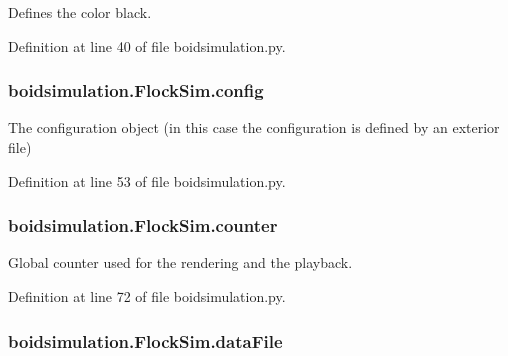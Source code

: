 Defines the color black. 



Definition at line 40 of file boidsimulation.\-py.

\hypertarget{classboidsimulation_1_1FlockSim_abf487d6e84851334a79656b5df3c8492}{
\subsubsection[{config}]{\setlength{\rightskip}{0pt plus 5cm}boidsimulation.\-Flock\-Sim.\-config}}\label{classboidsimulation_1_1FlockSim_abf487d6e84851334a79656b5df3c8492}


The configuration object (in this case the configuration is defined by an exterior file) 



Definition at line 53 of file boidsimulation.\-py.

\hypertarget{classboidsimulation_1_1FlockSim_af378fd310919691dec50f5d312931726}{
\subsubsection[{counter}]{\setlength{\rightskip}{0pt plus 5cm}boidsimulation.\-Flock\-Sim.\-counter}}\label{classboidsimulation_1_1FlockSim_af378fd310919691dec50f5d312931726}


Global counter used for the rendering and the playback. 



Definition at line 72 of file boidsimulation.\-py.

\hypertarget{classboidsimulation_1_1FlockSim_a96885e067ac2333f807eaa9580a2ece4}{
\subsubsection[{data\-File}]{\setlength{\rightskip}{0pt plus 5cm}boidsimulation.\-Flock\-Sim.\-data\-File}}\label{classboidsimulation_1_1FlockSim_a96885e067ac2333f807eaa9580a2ece4}


